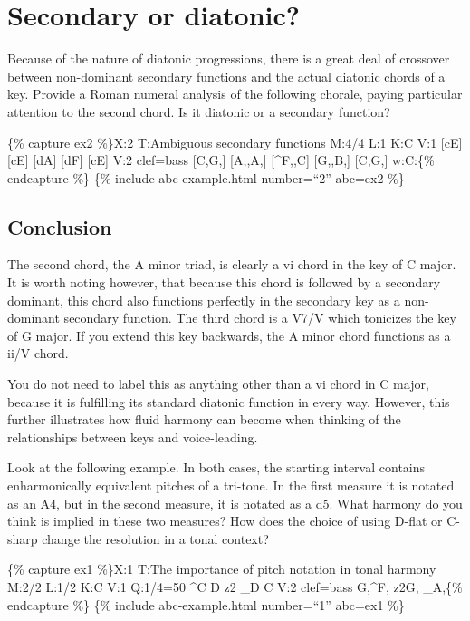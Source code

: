 \documentclass{book}
\begin{document}
\hypertarget{secondary-or-diatonic}{%
\section{Secondary or diatonic?}\label{secondary-or-diatonic}}

Because of the nature of diatonic progressions, there is a great deal of
crossover between non-dominant secondary functions and the actual diatonic
chords of a key. Provide a Roman numeral analysis of the following chorale,
paying particular attention to the second chord. Is it diatonic or a secondary
function?

\{\% capture ex2 \%\}X:2 T:Ambiguous secondary functions M:4/4 L:1 K:C V:1
{[}cE{]}\textbar{} {[}cE{]}\textbar{} {[}dA{]}\textbar{} {[}dF{]}\textbar{}
{[}cE{]}\textbar{]} V:2 clef=bass {[}C,G,{]}\textbar{} {[}A,,A,{]}\textbar{}
{[}\^{}F,,C{]}\textbar{} {[}G,,B,{]}\textbar{} {[}C,G,{]}\textbar{]} w:C:\{\%
endcapture \%\} \{\% include abc-example.html number=``2'' abc=ex2 \%\}

\hypertarget{conclusion-11}{%
\subsection{Conclusion}\label{conclusion-11}}

The second chord, the A minor triad, is clearly a vi chord in the key of C
major. It is worth noting however, that because this chord is followed by a
secondary dominant, this chord also functions perfectly in the secondary key
as a non-dominant secondary function. The third chord is a V7/V which
tonicizes the key of G major. If you extend this key backwards, the A minor
chord functions as a ii/V chord.

You do not need to label this as anything other than a vi chord in C major,
because it is fulfilling its standard diatonic function in every way. However,
this further illustrates how fluid harmony can become when thinking of the
relationships between keys and voice-leading.

Look at the following example. In both cases, the starting interval contains
enharmonically equivalent pitches of a tri-tone. In the first measure it is
notated as an A4, but in the second measure, it is notated as a d5. What
harmony do you think is implied in these two measures? How does the choice of
using D-flat or C-sharp change the resolution in a tonal context?

\{\% capture ex1 \%\}X:1 T:The importance of pitch notation in tonal harmony
M:2/2 L:1/2 K:C V:1 Q:1/4=50 \^{}C D\textbar\textbar{} z2\textbar\textbar{}
\_D C\textbar{]} V:2 clef=bass G,\^{}F,\textbar\textbar{}
z2\textbar\textbar G, \_A,\textbar{]}\{\% endcapture \%\} \{\% include
abc-example.html number=``1'' abc=ex1 \%\}
\end{document}
